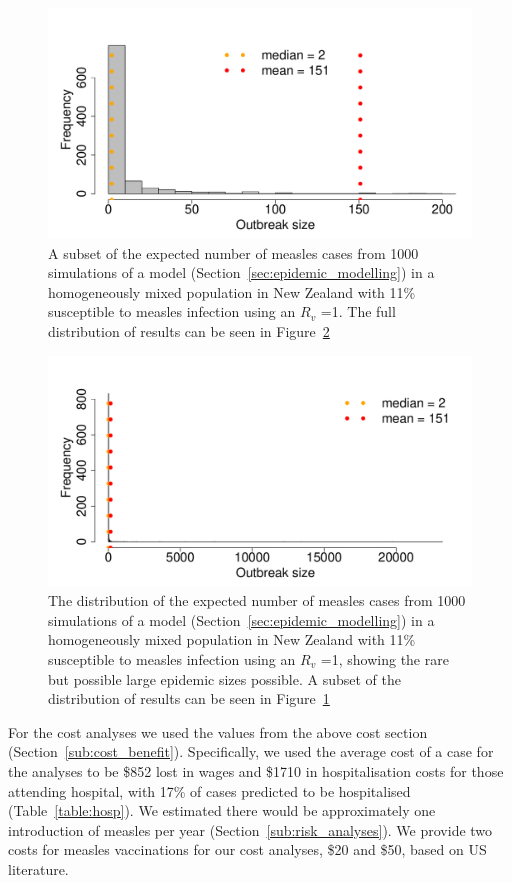 \documentclass{article}
\begin{document}
\begin{figure}
     \centering
\includegraphics{interimreport2-037}
     \caption{A subset of the expected number of measles cases from 1000 simulations of a model (Section~\ref{sec:epidemic_modelling}) in a homogeneously mixed population in New Zealand with 11\% susceptible to measles infection using an $R_v$ =1. The full distribution of results can be seen in Figure~\ref{fig:sim1}}
     \label{fig:sim}
\end{figure}

\begin{figure}
     \centering
\includegraphics{interimreport2-038}
     \caption{The distribution of the expected number of measles cases from 1000 simulations of a model (Section~\ref{sec:epidemic_modelling}) in a homogeneously mixed population in New Zealand with 11\% susceptible to measles infection using an $R_v$ =1, showing the rare but possible large epidemic sizes possible. A subset of the distribution of results can be seen in Figure~\ref{fig:sim}}
     \label{fig:sim1}
\end{figure}

For the cost analyses we used the values from the above cost section (Section~\ref{sub:cost_benefit}). Specifically, we used the average cost of a case for the analyses to be \$852 lost in wages and \$1710 in hospitalisation costs for those attending hospital, with 17\% of cases predicted to be hospitalised (Table~\ref{table:hosp}). We estimated there would be approximately one introduction of measles per year (Section~\ref{sub:risk_analyses}). We provide two costs for measles vaccinations for our cost analyses, \$20 and \$50, based on US literature.
\end{document}
